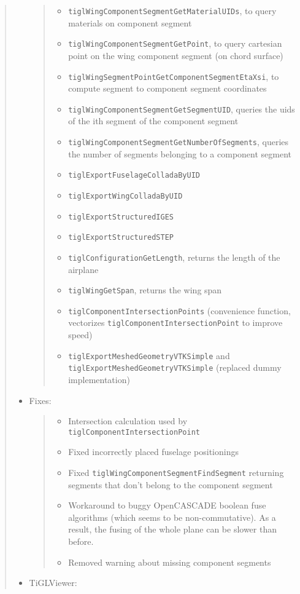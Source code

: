 \documentclass[]{scrartcl}
\begin{document}
\begin{quote}
\begin{itemize}
  \begin{quote}
  \begin{itemize}
  \itemsep1pt\parskip0pt
  \item
    \texttt{tiglWingComponentSegmentGetMaterialUIDs}, to query materials
    on component segment
  \item
    \texttt{tiglWingComponentSegmentGetPoint}, to query cartesian point
    on the wing component segment (on chord surface)
  \item
    \texttt{tiglWingSegmentPointGetComponentSegmentEtaXsi}, to compute
    segment to component segment coordinates
  \item
    \texttt{tiglWingComponentSegmentGetSegmentUID}, queries the uids of
    the ith segment of the component segment
  \item
    \texttt{tiglWingComponentSegmentGetNumberOfSegments}, queries the
    number of segments belonging to a component segment
  \item
    \texttt{tiglExportFuselageColladaByUID}
  \item
    \texttt{tiglExportWingColladaByUID}
  \item
    \texttt{tiglExportStructuredIGES}
  \item
    \texttt{tiglExportStructuredSTEP}
  \item
    \texttt{tiglConfigurationGetLength}, returns the length of the
    airplane
  \item
    \texttt{tiglWingGetSpan}, returns the wing span
  \item
    \texttt{tiglComponentIntersectionPoints} (convenience function,
    vectorizes \texttt{tiglComponentIntersectionPoint} to improve speed)
  \item
    \texttt{tiglExportMeshedGeometryVTKSimple} and
    \texttt{tiglExportMeshedGeometryVTKSimple} (replaced dummy
    implementation)
  \end{itemize}
  \end{quote}
\item
  Fixes:

  \begin{quote}
  \begin{itemize}
  \itemsep1pt\parskip0pt
  \item
    Intersection calculation used by
    \texttt{tiglComponentIntersectionPoint}
  \item
    Fixed incorrectly placed fuselage positionings
  \item
    Fixed \texttt{tiglWingComponentSegmentFindSegment} returning
    segments that don't belong to the component segment
  \item
    Workaround to buggy OpenCASCADE boolean fuse algorithms (which seems
    to be non-commutative). As a result, the fusing of the whole plane
    can be slower than before.
  \item
    Removed warning about missing component segments
  \end{itemize}
  \end{quote}
\item
  TiGLViewer:


\end{itemize}
\end{quote}
\end{document}
